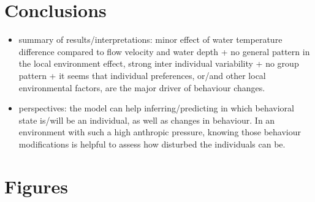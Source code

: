 \documentclass[
  letterpaper,
  DIV=11,
  numbers=noendperiod]{scrartcl}
\begin{document}
\hypertarget{conclusions}{%
\section{Conclusions}\label{conclusions}}

\begin{itemize}
\item
  summary of results/interpretations: minor effect of water temperature
  difference compared to flow velocity and water depth + no general
  pattern in the local environment effect, strong inter individual
  variability + no group pattern + it seems that individual preferences,
  or/and other local environmental factors, are the major driver of
  behaviour changes.
\item
  perspectives: the model can help inferring/predicting in which
  behavioral state is/will be an individual, as well as changes in
  behaviour. In an environment with such a high anthropic pressure,
  knowing those behaviour modifications is helpful to assess how
  disturbed the individuals can be.
\end{itemize}

\hypertarget{figures}{%
\section{Figures}\label{figures}}
\end{document}
